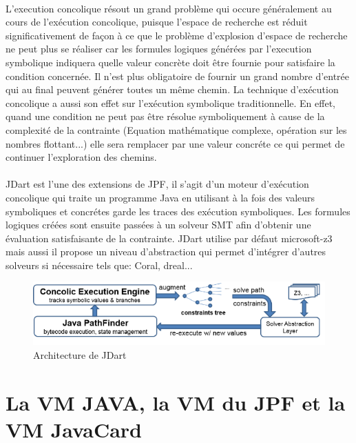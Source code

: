 			\paragraph{}
				L'execution concolique résout un grand problème qui occure généralement au cours de l'exécution concolique,
				puisque l'espace de recherche est réduit significativement de façon à ce que le problème d'explosion d'espace de recherche
				ne peut plus se réaliser car les formules logiques générées par l'execution symbolique indiquera quelle valeur concrète
				doit être fournie pour satisfaire la condition concernée.
				Il n'est plus obligatoire de fournir un grand nombre d'entrée qui au final peuvent générer toutes un même chemin.
				\newline
				La technique d'exécution concolique a aussi son effet sur l'exécution symbolique traditionnelle.
				En effet, quand une condition ne peut pas être résolue symboliquement à cause de la complexité de la contrainte (Equation mathématique complexe,
				opération sur les nombres flottant...) elle sera remplacer par une valeur concréte ce qui permet de continuer l'exploration des chemins.

			\paragraph{}
				JDart est l'une des extensions de \gls{JPF}, il s'agit d'un moteur d'exécution concolique qui traite un programme Java
				en utilisant à la fois des valeurs symboliques et concrétes garde les traces des exécution symboliques.
				Les formules logiques créées sont ensuite passées à un solveur \gls{SMT} afin d'obtenir une évaluation satisfaisante de la contrainte.
				JDart utilise par défaut \gls{microsoft-z3} mais aussi il propose un niveau d'abstraction qui permet d'intégrer d'autres solveurs
				si nécessaire tels que: Coral, dreal...
				
			\begin{figure}[H]
				\centering
					\includegraphics[scale=0.5]{images/archJDart.png}
				\caption{Architecture de JDart}
			\end{figure}
				
      
	\section{La VM JAVA, la VM du JPF et la VM JavaCard}
